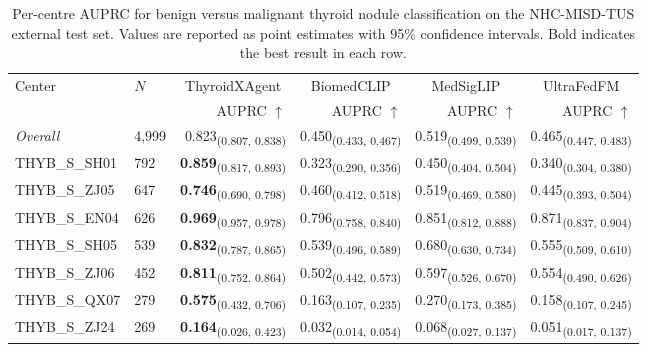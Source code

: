 \begin{table}[p]
\centering
\caption{Per-centre AUPRC for benign versus malignant thyroid nodule classification on the NHC-MISD-TUS external test set. Values are reported as point estimates with 95\% confidence intervals. Bold indicates the best result in each row.}
\label{tab:binary_auprc}
\footnotesize
\setlength{\tabcolsep}{4pt}
\begin{tabular}{llrrrr}
\toprule
\multirow{2}{*}{Center} & \multirow{2}{*}{$N$} & \multicolumn{1}{c}{ThyroidXAgent} & \multicolumn{1}{c}{BiomedCLIP} & \multicolumn{1}{c}{MedSigLIP} & \multicolumn{1}{c}{UltraFedFM} \\
\cmidrule(lr){3-3} \cmidrule(lr){4-4} \cmidrule(lr){5-5} \cmidrule(lr){6-6}
 & & AUPRC $\uparrow$ & AUPRC $\uparrow$ & AUPRC $\uparrow$ & AUPRC $\uparrow$ \\
\midrule
\textit{Overall} & 4,999 & 0.823\textsubscript{(0.807, 0.838)} & 0.450\textsubscript{(0.433, 0.467)} & 0.519\textsubscript{(0.499, 0.539)} & 0.465\textsubscript{(0.447, 0.483)} \\
\midrule
THYB\_S\_SH01 & 792 & \textbf{0.859}\textsubscript{(0.817, 0.893)} & 0.323\textsubscript{(0.290, 0.356)} & 0.450\textsubscript{(0.404, 0.504)} & 0.340\textsubscript{(0.304, 0.380)} \\
THYB\_S\_ZJ05 & 647 & \textbf{0.746}\textsubscript{(0.690, 0.798)} & 0.460\textsubscript{(0.412, 0.518)} & 0.519\textsubscript{(0.469, 0.580)} & 0.445\textsubscript{(0.393, 0.504)} \\
THYB\_S\_EN04 & 626 & \textbf{0.969}\textsubscript{(0.957, 0.978)} & 0.796\textsubscript{(0.758, 0.840)} & 0.851\textsubscript{(0.812, 0.888)} & 0.871\textsubscript{(0.837, 0.904)} \\
THYB\_S\_SH05 & 539 & \textbf{0.832}\textsubscript{(0.787, 0.865)} & 0.539\textsubscript{(0.496, 0.589)} & 0.680\textsubscript{(0.630, 0.734)} & 0.555\textsubscript{(0.509, 0.610)} \\
THYB\_S\_ZJ06 & 452 & \textbf{0.811}\textsubscript{(0.752, 0.864)} & 0.502\textsubscript{(0.442, 0.573)} & 0.597\textsubscript{(0.526, 0.670)} & 0.554\textsubscript{(0.490, 0.626)} \\
THYB\_S\_QX07 & 279 & \textbf{0.575}\textsubscript{(0.432, 0.706)} & 0.163\textsubscript{(0.107, 0.235)} & 0.270\textsubscript{(0.173, 0.385)} & 0.158\textsubscript{(0.107, 0.245)} \\
THYB\_S\_ZJ24 & 269 & \textbf{0.164}\textsubscript{(0.026, 0.423)} & 0.032\textsubscript{(0.014, 0.054)} & 0.068\textsubscript{(0.027, 0.137)} & 0.051\textsubscript{(0.017, 0.137)} \\

\end{tabular}
\end{table}
